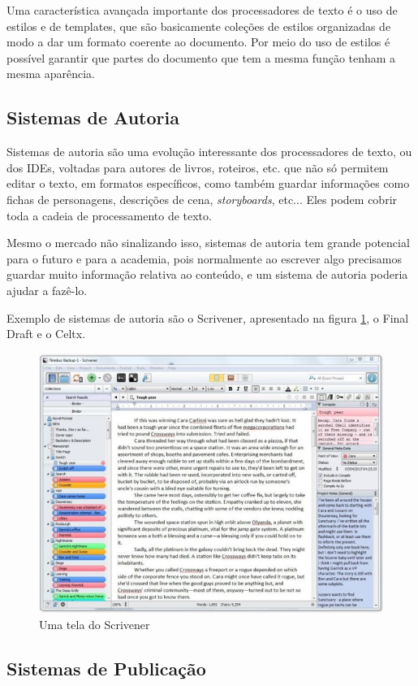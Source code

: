 Uma característica avançada importante dos processadores de texto é o uso de estilos e de templates, que são basicamente coleções de estilos organizadas de modo a dar um formato coerente ao documento. Por meio do uso de estilos é possível garantir que partes do documento que tem a mesma função tenham a mesma aparência.

\subsection{Sistemas de Autoria}

Sistemas de autoria são uma evolução interessante dos processadores de texto, ou dos IDEs, voltadas para autores de livros, roteiros, etc. que não só permitem editar o texto, em formatos específicos, como também guardar informações como fichas de personagens, descrições de cena, \textit{storyboards}, etc... Eles podem cobrir toda a cadeia de processamento de texto.

Mesmo o mercado não sinalizando isso, sistemas de autoria tem grande potencial para o futuro e para a academia, pois normalmente ao escrever algo precisamos guardar muito informação relativa ao conteúdo, e um sistema de autoria poderia ajudar a fazê-lo. 

Exemplo de sistemas de autoria são o Scrivener, apresentado na figura \ref{fig:scrivener}, o Final Draft e o Celtx.

\begin{figure}[hbt]
    \centering
    \includegraphics[width=0.7\linewidth]{Images/scrivener}
    \caption[Uma tela do Scrivener]{Uma tela do Scrivener}
    \label{fig:scrivener}
\end{figure}


\subsection{Sistemas de Publicação}

